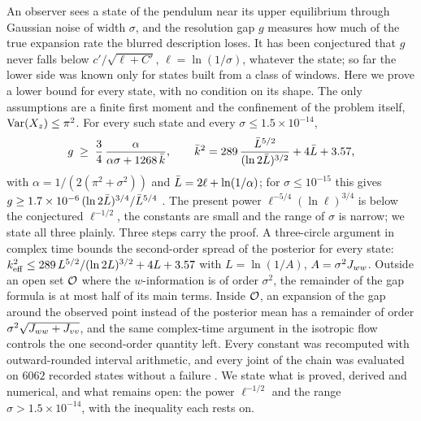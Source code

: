 An observer sees a state of the pendulum near its upper equilibrium through Gaussian noise of width $\sigma$, and the resolution gap $g$ measures how much of the true expansion rate the blurred description loses.
It has been conjectured that $g$ never falls below $c'/\sqrt{\ell+C'}$, $\ell=\ln(1/\sigma)$, whatever the state; so far the lower side was known only for states built from a class of windows.
Here we prove a lower bound for every state, with no condition on its shape.
The only assumptions are a finite first moment and the confinement of the problem itself, $\operatorname{Var}(X_z)\le\pi^2$.
For every such state and every $\sigma\le1.5\times10^{-14}$,
\[
g\;\ge\;\frac{3}{4}\,\frac{\alpha}{\alpha\sigma+1268\,\bar k},\qquad \bar k^2=289\,\frac{\bar L^{5/2}}{(\ln2\bar L)^{3/2}}+4\bar L+3.57,
\]
with $\alpha=1/(2(\pi^2+\sigma^2))$ and $\bar L=2\ell+\ln(1/\alpha)$; for $\sigma\le10^{-15}$ this gives $g\ge1.7\times10^{-6}\,(\ln2\bar L)^{3/4}/\bar L^{5/4}$ \proofst.
The present power $\ell^{-5/4}(\ln\ell)^{3/4}$ is below the conjectured $\ell^{-1/2}$, the constants are small and the range of $\sigma$ is narrow; we state all three plainly.
Three steps carry the proof.
A three-circle argument in complex time bounds the second-order spread of the posterior for every state: $k_{\mathrm{eff}}^2\le289\,L^{5/2}/(\ln2L)^{3/2}+4L+3.57$ with $L=\ln(1/A)$, $A=\sigma^2J_{ww}$.
Outside an open set $\mathcal O$ where the $w$-information is of order $\sigma^2$, the remainder of the gap formula is at most half of its main terms.
Inside $\mathcal O$, an expansion of the gap around the observed point instead of the posterior mean has a remainder of order $\sigma^2\sqrt{J_{ww}+J_{vv}}$, and the same complex-time argument in the isotropic flow controls the one second-order quantity left.
Every constant was recomputed with outward-rounded interval arithmetic, and every joint of the chain was evaluated on $6062$ recorded states without a failure \numst.
We state what is proved, derived and numerical, and what remains open: the power $\ell^{-1/2}$ and the range $\sigma>1.5\times10^{-14}$, with the inequality each rests on.

